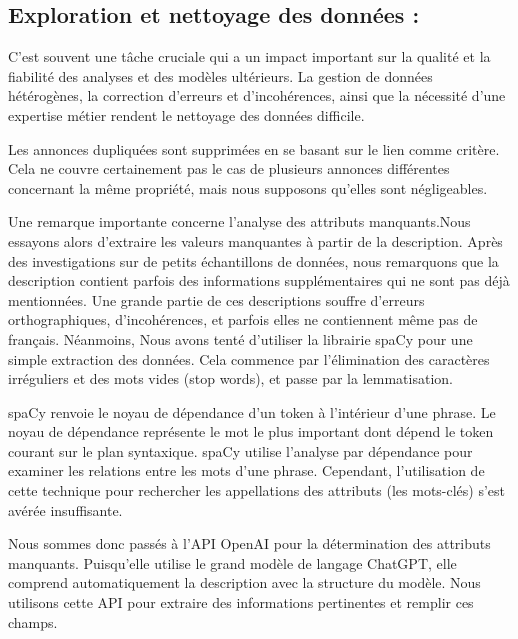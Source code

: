 \documentclass[a4paper,12pt]{report}
\numberwithin{equation}{section}
\begin{document}
\subsection{Exploration et nettoyage des données : }
\par
C'est souvent une tâche cruciale qui a un impact important sur la qualité et la fiabilité des analyses et des modèles ultérieurs. La gestion de données hétérogènes, la correction d'erreurs et d'incohérences, ainsi que la nécessité d'une expertise métier rendent le nettoyage des données difficile.
\\ \par
Les annonces dupliquées sont supprimées en se basant sur le lien comme critère. Cela ne couvre certainement pas le cas de plusieurs annonces différentes concernant la même propriété, mais nous supposons qu'elles sont négligeables.
\\ \par
Une remarque importante concerne l’analyse des attributs manquants.Nous essayons alors d’extraire les valeurs manquantes à partir de la description. Après des investigations sur de petits échantillons de données, nous remarquons que la description contient parfois des informations supplémentaires qui ne sont pas déjà mentionnées. Une grande partie de ces descriptions souffre d’erreurs orthographiques, d’incohérences, et parfois elles ne contiennent même pas de français. Néanmoins, Nous avons tenté d’utiliser la librairie spaCy pour une simple extraction des données. Cela commence par l'élimination des caractères irréguliers et des mots vides (stop words), et passe par la lemmatisation.
\\ \par
spaCy renvoie le noyau de dépendance d'un token à l'intérieur d'une phrase. Le noyau de dépendance représente le mot le plus important dont dépend le token courant sur le plan syntaxique. spaCy utilise l'analyse par dépendance pour examiner les relations entre les mots d'une phrase. Cependant, l’utilisation de cette technique pour rechercher les appellations des attributs (les mots-clés) s'est avérée insuffisante.
\\ \par
Nous sommes donc passés à l'API OpenAI pour la détermination des attributs manquants. Puisqu'elle utilise le grand modèle de langage ChatGPT, elle comprend automatiquement la description avec la structure du modèle. Nous utilisons cette API pour extraire des informations pertinentes et remplir ces champs. 
\\ \par
\end{document}
